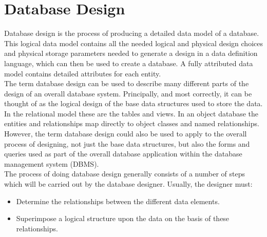 \section{Database Design}
Database design is the process of producing a detailed data model of a database. This logical data model contains all the needed logical and physical design choices and physical storage parameters needed to generate a design in a data definition language, which can then be used to create a database. A fully attributed data model contains detailed attributes for each entity.\\

The term database design can be used to describe many different parts of the design of an overall database system. Principally, and most correctly, it can be thought of as the logical design of the base data structures used to store the data. In the relational model these are the tables and views. In an object database the entities and relationships map directly to object classes and named relationships. However, the term database design could also be used to apply to the overall process of designing, not just the base data structures, but also the forms and queries used as part of the overall database application within the database management system (DBMS).\\

The process of doing database design generally consists of a number of steps which will be carried out by the database designer. Usually, the designer must:
\begin{itemize}
\item Determine the relationships between the different data elements.
\item Superimpose a logical structure upon the data on the basis of these relationships.
\end{itemize}

